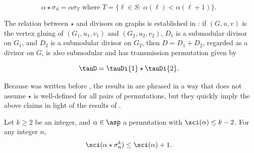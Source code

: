 \begin{equation}\label{eq:starSigma}
\alpha \star \sigma_S =  \alpha \sigma_T
\mbox{ where }
T = \{ \ell \in S:\ \alpha(\ell) < \alpha(\ell+1)\}.
\end{equation}


The relation between $\star$ and divisors on graphs is established in \cite[Theorem 3.11]{Pfl17}: if $(G,u,v)$ is the vertex gluing of $(G_1,u_1, v_1)$ and $(G_2, u_2, v_2)$, $D_1$ is a submodular divisor on $G_1$, and $D_2$ is a submodular divisor on $G_2$, then $D = D_1 + D_2$, regarded as a divisor on $G$, is also submodular and has transmission permutation given by

\begin{equation}\label{eq:tauGlued}
\tauD = \tauDi{1} \star \tauDi{2}.
\end{equation}

\begin{rema}
Because \cite{Pfl17} was written before \cite{PflDemProd}, the results in \cite{Pfl17} are phrased in a way that does not assume $\star$ is well-defined for all pairs of permutations, but they quickly imply the above claims in light of the results of \cite{PflDemProd}.
\end{rema}

\begin{lemma}\label{lem-SciSimpleRefl}
Let $k \geq 2$ be an integer, and $\alpha \in \asp$ a permutation with $\sci(\alpha) \leq k-2$. For any integer $n$,
$$\sci(\alpha \star \sigma^k_n) \leq \sci(\alpha)+1.$$
\end{lemma}

